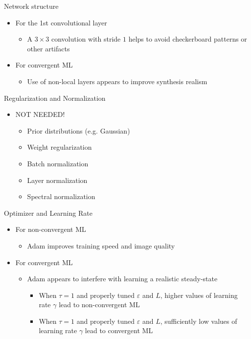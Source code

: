 \documentclass{beamer}
\begin{document}
\begin{frame}{Network structure}
\begin{itemize}
\item For the 1st convolutional layer
\begin{itemize}
\item A $3\times3$ convolution with stride $1$ helps to avoid checkerboard patterns or other artifacts
\end{itemize}
\item For convergent ML
\begin{itemize}
\item Use of non-local layers appears to improve synthesis realism
\end{itemize}
\end{itemize}
\end{frame}

\begin{frame}{Regularization and Normalization}
\begin{itemize}
\item NOT NEEDED!
\begin{itemize}
\item Prior distributions (e.g. Gaussian)
\item Weight regularization
\item Batch normalization
\item Layer normalization
\item Spectral normalization
\end{itemize}
\end{itemize}
\end{frame}

\begin{frame}{Optimizer and Learning Rate}
\begin{itemize}
\item For non-convergent ML
\begin{itemize}
\item Adam improves training speed and image quality
\end{itemize}
\item For convergent ML
\begin{itemize}
\item Adam appears to interfere with learning a realistic steady-state
\begin{itemize}
\item When $\tau=1$ and properly tuned $\varepsilon$ and $L$, higher values of learning rate $\gamma$ lead to non-convergent ML
\item When $\tau=1$ and properly tuned $\varepsilon$ and $L$, sufficiently low values of learning rate $\gamma$ lead to convergent ML
\end{itemize}
\end{itemize}
\end{itemize}
\end{frame}
\end{document}
